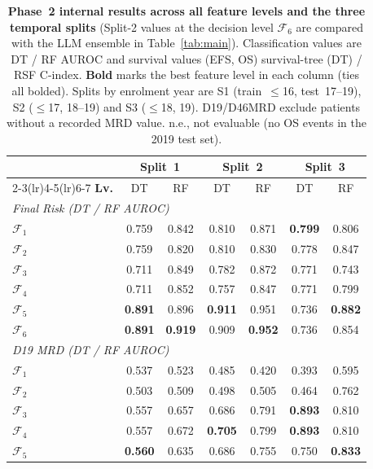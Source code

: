 \documentclass[pdflatex,sn-nature]{sn-jnl}
\begin{document}
\begin{appendices}
\begin{table}[p]
\caption{\textbf{Phase~2 internal results across all feature levels and
the three temporal splits} (Split-2 values at the decision level $\mathcal{F}_6$ are compared with the LLM ensemble in Table~\ref{tab:main}). Classification values are DT / RF AUROC and survival
values (EFS, OS) survival-tree (DT) / RSF C-index. \textbf{Bold} marks
the best feature level in each column (ties all bolded). Splits by enrolment year are S1
(train~$\leq$16, test~17--19), S2 ($\leq$17, 18--19) and S3 ($\leq$18, 19).
D19/D46MRD exclude patients without a recorded MRD value.
n.e., not evaluable (no OS events in the 2019 test set).}
\label{tab:phase2_int_full}
\centering
\footnotesize
\renewcommand{\arraystretch}{0.88}
\setlength{\tabcolsep}{5pt}
\begin{tabular}{@{}l cc cc cc@{}}
\toprule
 & \multicolumn{2}{c}{\textbf{Split~1}} & \multicolumn{2}{c}{\textbf{Split~2}} & \multicolumn{2}{c}{\textbf{Split~3}} \\
\cmidrule(lr){2-3}\cmidrule(lr){4-5}\cmidrule(lr){6-7}
\textbf{Lv.} & DT & RF & DT & RF & DT & RF \\
\midrule
\multicolumn{7}{l}{\textit{Final Risk (DT / RF AUROC)}} \\
$\mathcal{F}_1$ & 0.759 & 0.842 & 0.810 & 0.871 & \textbf{0.799} & 0.806 \\
$\mathcal{F}_2$ & 0.759 & 0.820 & 0.810 & 0.830 & 0.778 & 0.847 \\
$\mathcal{F}_3$ & 0.711 & 0.849 & 0.782 & 0.872 & 0.771 & 0.743 \\
$\mathcal{F}_4$ & 0.711 & 0.852 & 0.757 & 0.847 & 0.771 & 0.799 \\
$\mathcal{F}_5$ & \textbf{0.891} & 0.896 & \textbf{0.911} & 0.951 & 0.736 & \textbf{0.882} \\
$\mathcal{F}_6$ & \textbf{0.891} & \textbf{0.919} & 0.909 & \textbf{0.952} & 0.736 & 0.854 \\
\multicolumn{7}{l}{\textit{D19 MRD (DT / RF AUROC)}} \\
$\mathcal{F}_1$ & 0.537 & 0.523 & 0.485 & 0.420 & 0.393 & 0.595 \\
$\mathcal{F}_2$ & 0.503 & 0.509 & 0.498 & 0.505 & 0.464 & 0.762 \\
$\mathcal{F}_3$ & 0.557 & 0.657 & 0.686 & 0.791 & \textbf{0.893} & 0.810 \\
$\mathcal{F}_4$ & 0.557 & 0.672 & \textbf{0.705} & 0.799 & \textbf{0.893} & 0.810 \\
$\mathcal{F}_5$ & \textbf{0.560} & 0.635 & 0.686 & 0.755 & 0.750 & \textbf{0.833} \\

\end{tabular}
\end{table}
\end{appendices}
\end{document}
